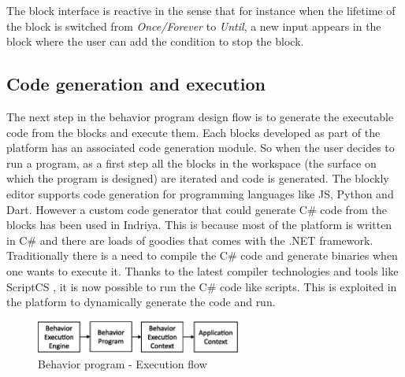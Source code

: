 The block interface is reactive in the sense that for instance when the lifetime of the block is switched from \emph{Once/Forever} to \emph{Until}, a new input appears in the block where the user can add the condition to stop the block.

\subsection{Code generation and execution}
The next step in the behavior program design flow is to generate the executable code from the blocks and execute them. Each blocks developed as part of the platform has an associated code generation module. So when the user decides to run a program, as a first step all the blocks in the workspace (the surface on which the program is designed) are iterated and code is generated. The blockly editor supports code generation for programming languages like JS, Python and Dart. However a custom code generator that could generate C\# code from the blocks has been used in Indriya. This is because most of the platform is written in C\# and there are loads of goodies that comes with the .NET framework. Traditionally there is a need to compile the C\# code and generate binaries when one wants to execute it. Thanks to the latest compiler technologies and tools like ScriptCS \cite{ScriptCS}, it is now possible to run the C\# code like scripts. This is exploited in the platform to dynamically generate the code and run.
\begin{figure}[H]
\centering
\includegraphics[width=0.6\textwidth]{../thesis/assets/execution_flow.eps}
\caption[Behavior program - Execution flow]{Behavior program - Execution flow}
\label{fig:program_execution}
\end{figure}

